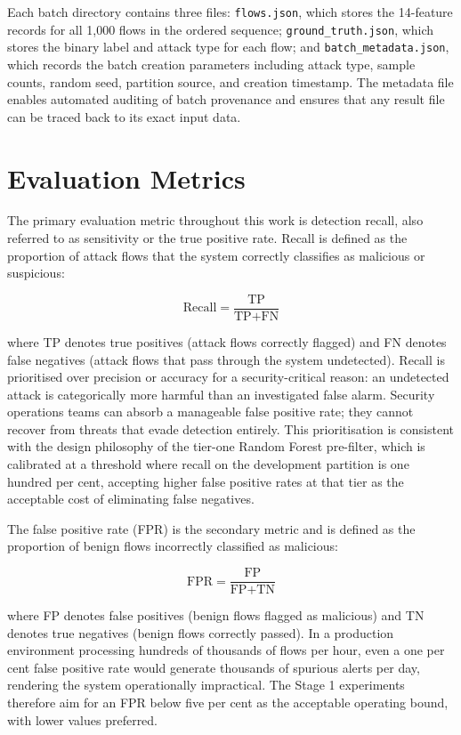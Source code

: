 Each batch directory contains three files: \texttt{flows.json}, which stores the 14-feature records for all 1,000 flows in the ordered sequence; \texttt{ground\_truth.json}, which stores the binary label and attack type for each flow; and \texttt{batch\_metadata.json}, which records the batch creation parameters including attack type, sample counts, random seed, partition source, and creation timestamp. The metadata file enables automated auditing of batch provenance and ensures that any result file can be traced back to its exact input data.

\section{Evaluation Metrics}
\label{sec:evaluation-metrics}

The primary evaluation metric throughout this work is detection recall, also referred to as sensitivity or the true positive rate. Recall is defined as the proportion of attack flows that the system correctly classifies as malicious or suspicious:

\begin{equation}
\text{Recall} = \frac{\text{TP}}{\text{TP} + \text{FN}}
\label{eq:recall}
\end{equation}

\noindent where TP denotes true positives (attack flows correctly flagged) and FN denotes false negatives (attack flows that pass through the system undetected). Recall is prioritised over precision or accuracy for a security-critical reason: an undetected attack is categorically more harmful than an investigated false alarm. Security operations teams can absorb a manageable false positive rate; they cannot recover from threats that evade detection entirely. This prioritisation is consistent with the design philosophy of the tier-one Random Forest pre-filter, which is calibrated at a threshold where recall on the development partition is one hundred per cent, accepting higher false positive rates at that tier as the acceptable cost of eliminating false negatives.

The false positive rate (FPR) is the secondary metric and is defined as the proportion of benign flows incorrectly classified as malicious:

\begin{equation}
\text{FPR} = \frac{\text{FP}}{\text{FP} + \text{TN}}
\label{eq:fpr}
\end{equation}

\noindent where FP denotes false positives (benign flows flagged as malicious) and TN denotes true negatives (benign flows correctly passed). In a production environment processing hundreds of thousands of flows per hour, even a one per cent false positive rate would generate thousands of spurious alerts per day, rendering the system operationally impractical. The Stage 1 experiments therefore aim for an FPR below five per cent as the acceptable operating bound, with lower values preferred.

